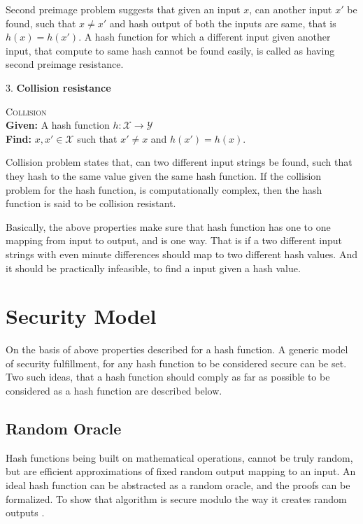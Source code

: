 Second preimage problem suggests that given an input $x$, can another input $x'$ be found, such that
$ x \neq x'$ and hash output of both the inputs are same, that is $h(x) = h(x')$. A hash function for
which a different input given another input, that compute to same hash cannot be found easily, is 
called as having second preimage resistance.

3. {\bf Collision resistance}
\begin{center}
  \framebox
  {
    \parbox{300pt}
    {
      \centering \textsc{Collision} \\
      {\bf Given:} A hash function $h : \mathcal{X} \to \mathcal{Y}$ \\
      {\bf Find:} $x, x' \in \mathcal{X}$ such that $x' \neq x$ and $h(x') = h(x)$. 
    }
  }
\end{center}
\vspace{4mm}

Collision problem states that, can two different input strings be found, such that they hash to the
same value given the same hash function. If the collision problem for the hash function, is computationally
complex, then the hash function is said to be collision resistant.

Basically, the above properties make sure that hash function has one to one mapping from input to
output, and is one way. That is if a two different input strings with even minute differences should
map to two different hash values. And it should be practically infeasible, to find a input given a
hash value. \\

\section{Security Model}

On the basis of above properties described for a hash function. A generic model of security fulfillment, 
for any hash function to be considered secure can be set. Two such ideas, that a hash function should
comply as far as possible to be considered as a hash function are described below.

  \subsection{ Random Oracle }
  Hash functions being built on mathematical operations, cannot be truly random, but are efficient
  approximations of fixed random output mapping to an input. An ideal hash function can be abstracted 
  as a random oracle, and the proofs can be formalized. To show that algorithm is secure modulo the way
  it creates random outputs \cite{00018}.

